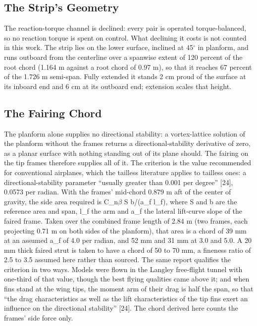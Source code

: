 \documentclass[journal]{new-aiaa}
\begin{document}
\subsection*{The Strip's Geometry}

The reaction-torque channel is declined: every pair is operated torque-balanced, so no reaction torque is spent on control. What declining it costs is not counted in this work. The strip lies on the lower surface, inclined at 45$^\circ$ in planform, and runs outboard from the centerline over a spanwise extent of 120 percent of the root chord (1.164 m against a root chord of 0.97 m), so that it reaches 67 percent of the 1.726 m semi-span. Fully extended it stands 2 cm proud of the surface at its inboard end and 6 cm at its outboard end; extension scales that height.

\subsection*{The Fairing Chord}

The planform alone supplies no directional stability: a vortex-lattice solution of the planform without the frames returns a directional-stability derivative of zero, as a planar surface with nothing standing out of its plane should. The fairing on the tip frames therefore supplies all of it. The criterion is the value recommended for conventional airplanes, which the tailless literature applies to tailless ones: a directional-stability parameter ``usually greater than 0.001 per degree'' [24], 0.0573 per radian. With the frames' mid-chord 0.879 m aft of the center of gravity, the side area required is C\_n$\beta$ S b/(a\_f l\_f), where S and b are the reference area and span, l\_f the arm and a\_f the lateral lift-curve slope of the faired frame. Taken over the combined frame length of 2.84 m (two frames, each projecting 0.71 m on both sides of the planform), that area is a chord of 39 mm at an assumed a\_f of 4.0 per radian, and 52 mm and 31 mm at 3.0 and 5.0. A 20 mm thick faired strut is taken to have a chord of 50 to 70 mm, a fineness ratio of 2.5 to 3.5 assumed here rather than sourced. The same report qualifies the criterion in two ways. Models were flown in the Langley free-flight tunnel with one-third of that value, though the best flying qualities came above it; and when fins stand at the wing tips, the moment arm of their drag is half the span, so that ``the drag characteristics as well as the lift characteristics of the tip fins exert an influence on the directional stability'' [24]. The chord derived here counts the frames' side force only.
\end{document}
